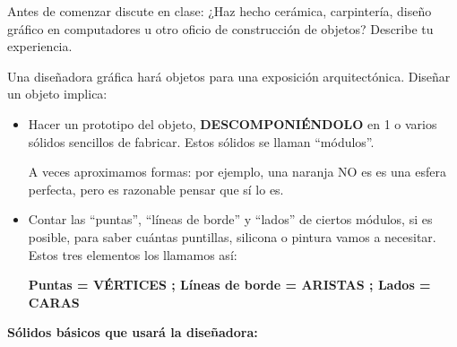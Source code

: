 \documentclass[12pt,a4paper]{article}
\begin{document}
\begin{tcolorbox}[colback=fondoverde, colframe=verdeclaro]
Antes de comenzar discute en clase: ¿Haz hecho cerámica, carpintería, diseño gráfico en computadores u otro oficio de construcción de objetos? Describe tu experiencia.
\end{tcolorbox}

Una diseñadora gráfica hará objetos para una exposición arquitectónica. Diseñar un objeto implica:

\begin{itemize}[nosep]
    \item Hacer un prototipo del objeto, \textbf{DESCOMPONIÉNDOLO} en 1 o varios sólidos sencillos de fabricar. Estos sólidos se llaman ``módulos''.

    A veces aproximamos formas: por ejemplo, una naranja NO es es una esfera perfecta, pero es razonable pensar que sí lo es.

    \item Contar las ``puntas'', ``líneas de borde'' y ``lados'' de ciertos módulos, si es posible, para saber cuántas puntillas, silicona o pintura vamos a necesitar. Estos tres elementos los llamamos así:

    \textbf{Puntas = VÉRTICES ; Líneas de borde = ARISTAS ; Lados = CARAS}
\end{itemize}

\textbf{Sólidos básicos que usará la diseñadora:}
\end{document}
